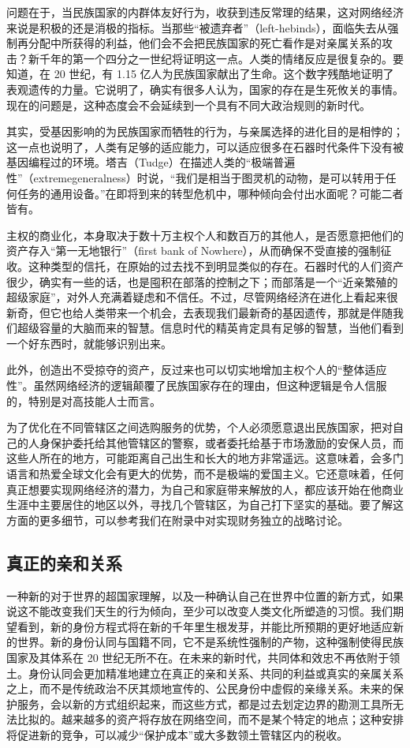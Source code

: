 问题在于，当民族国家的内群体友好行为，收获到违反常理的结果，这对网络经济来说是积极的还是消极的指标。当那些“被遗弃者”（left-hebinds），面临失去从强制再分配中所获得的利益，他们会不会把民族国家的死亡看作是对亲属关系的攻击？新千年的第一个四分之一世纪将证明这一点。人类的情绪反应是很复杂的。要知道，在 20 世纪，有 1.15 亿人为民族国家献出了生命。这个数字残酷地证明了表观遗传的力量。它说明了，确实有很多人认为，国家的存在是生死攸关的事情。现在的问题是，这种态度会不会延续到一个具有不同大政治规则的新时代。

其实，受基因影响的为民族国家而牺牲的行为，与亲属选择的进化目的是相悖的；这一点也说明了，人类有足够的适应能力，可以适应很多在石器时代条件下没有被基因编程过的环境。塔吉（Tudge）在描述人类的“极端普遍性”（extremegeneralness）时说，“我们是相当于图灵机的动物，是可以转用于任何任务的通用设备。”在即将到来的转型危机中，哪种倾向会付出水面呢？可能二者皆有。

主权的商业化，本身取决于数十万主权个人和数百万的其他人，是否愿意把他们的资产存入“第一无地银行”（first bank of Nowhere），从而确保不受直接的强制征收。这种类型的信托，在原始的过去找不到明显类似的存在。石器时代的人们资产很少，确实有一些的话，也是囤积在部落的控制之下；而部落是一个“近亲繁殖的超级家庭”，对外人充满着疑虑和不信任。不过，尽管网络经济在进化上看起来很新奇，但它也给人类带来一个机会，去表现我们最新奇的基因遗传，那就是伴随我们超级容量的大脑而来的智慧。信息时代的精英肯定具有足够的智慧，当他们看到一个好东西时，就能够识别出来。

此外，创造出不受掠夺的资产，反过来也可以切实地增加主权个人的“整体适应性”。虽然网络经济的逻辑颠覆了民族国家存在的理由，但这种逻辑是令人信服的，特别是对高技能人士而言。

为了优化在不同管辖区之间选购服务的优势，个人必须愿意退出民族国家，把对自己的人身保护委托给其他管辖区的警察，或者委托给基于市场激励的安保人员，而这些人所在的地方，可能距离自己出生和长大的地方非常遥远。这意味着，会多门语言和热爱全球文化会有更大的优势，而不是极端的爱国主义。它还意味着，任何真正想要实现网络经济的潜力，为自己和家庭带来解放的人，都应该开始在他商业生涯中主要居住的地区以外，寻找几个管辖区，为自己打下坚实的基础。要了解这方面的更多细节，可以参考我们在附录中对实现财务独立的战略讨论。

\subsection{真正的亲和关系}
一种新的对于世界的超国家理解，以及一种确认自己在世界中位置的新方式，如果说这不能改变我们天生的行为倾向，至少可以改变人类文化所塑造的习惯。我们期望看到，新的身份方程式将在新的千年里生根发芽，并能比所预期的更好地适应新的世界。新的身份认同与国籍不同，它不是系统性强制的产物，这种强制使得民族国家及其体系在 20 世纪无所不在。在未来的新时代，共同体和效忠不再依附于领土。身份认同会更加精准地建立在真正的亲和关系、共同的利益或真实的亲属关系之上，而不是传统政治不厌其烦地宣传的、公民身份中虚假的亲缘关系。未来的保护服务，会以新的方式组织起来，而这些方式，都是过去划定边界的勘测工具所无法比拟的。越来越多的资产将存放在网络空间，而不是某个特定的地点；这种安排将促进新的竞争，可以减少“保护成本”或大多数领土管辖区内的税收。

